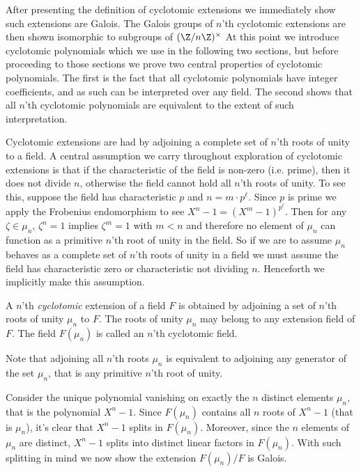After presenting the definition of cyclotomic extensions we immediately show such extensions are Galois.
The Galois groups of $n$'th cyclotomic extensions are then shown isomorphic to subgroups of $(\Z/n\Z)^\times$
At this point we introduce cyclotomic polynomials which we use in the following two sections, but before proceeding to those sections we prove two central properties of cyclotomic polynomials.
The first is the fact that all cyclotomic polynomials have integer coefficients, and as such can be interpreted over any field.
The second shows that all $n$'th cyclotomic polynomials are equivalent to the extent of such interpretation.

Cyclotomic extensions are had by adjoining a complete set of $n$'th roots of unity to a field.
A central assumption we carry throughout exploration of cyclotomic extensions is that if the characteristic of the field is non-zero (i.e. prime), then it does not divide $n$, otherwise the field cannot hold all $n$'th roots of unity.
To see this, suppose the field has characteristic $p$ and $n=m\cdot p^\ell$.
Since $p$ is prime we apply the Frobenius endomorphism to see $X^n-1=(X^m-1)^{p^\ell}$.
Then for any $\zeta\in\mu_n$, $\zeta^n=1$ implies $\zeta^m=1$ with $m<n$ and therefore no element of $\mu_n$ can function as a primitive $n$'th root of unity in the field.
So if we are to assume $\mu_n$ behaves as a complete set of $n$'th roots of unity in a field we must assume the field has characteristic zero or characteristic not dividing $n$.
Henceforth we implicitly make this assumption.

\begin{definition}
    A $n$'th \emph{cyclotomic} extension of a field $F$ is obtained by adjoining a set of $n$'th roots of unity $\mu_n$ to $F$.
    The roots of unity $\mu_n$ may belong to any extension field of $F$.
    The field $F(\mu_n)$ is called an $n$'th cyclotomic field.
\end{definition}
Note that adjoining all $n$'th roots $\mu_n$ is equivalent to adjoining any generator of the set $\mu_n$, that is any primitive $n$'th root of unity.

Consider the unique polynomial vanishing on exactly the $n$ distinct elements $\mu_n$, that is the polynomial $X^n-1$.
Since $F(\mu_n)$ contains all $n$ roots of $X^n-1$ (that is $\mu_n$), it's clear that $X^n-1$ splits in $F(\mu_n)$.
Moreover, since the $n$ elements of $\mu_n$ are distinct, $X^n-1$ splits into distinct linear factors in $F(\mu_n)$.
With such splitting in mind we now show the extension $F(\mu_n)/F$ is Galois.


